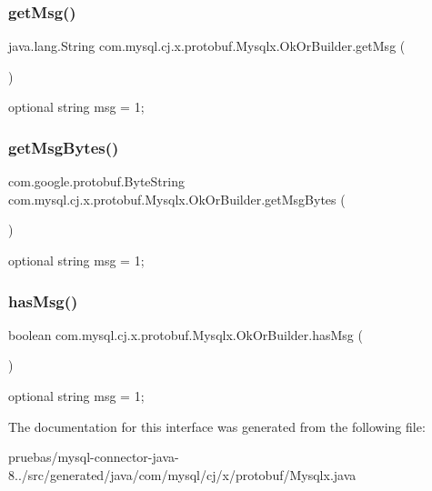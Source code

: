 \subsubsection{\texorpdfstring{get\+Msg()}{getMsg()}}
{\footnotesize\ttfamily java.\+lang.\+String com.\+mysql.\+cj.\+x.\+protobuf.\+Mysqlx.\+Ok\+Or\+Builder.\+get\+Msg (\begin{DoxyParamCaption}{ }\end{DoxyParamCaption})}

{\ttfamily optional string msg = 1;} \mbox{\label{interfacecom_1_1mysql_1_1cj_1_1x_1_1protobuf_1_1_mysqlx_1_1_ok_or_builder_af92cf058531f0821e02b879fcebb390d}} 
\subsubsection{\texorpdfstring{get\+Msg\+Bytes()}{getMsgBytes()}}
{\footnotesize\ttfamily com.\+google.\+protobuf.\+Byte\+String com.\+mysql.\+cj.\+x.\+protobuf.\+Mysqlx.\+Ok\+Or\+Builder.\+get\+Msg\+Bytes (\begin{DoxyParamCaption}{ }\end{DoxyParamCaption})}

{\ttfamily optional string msg = 1;} \mbox{\label{interfacecom_1_1mysql_1_1cj_1_1x_1_1protobuf_1_1_mysqlx_1_1_ok_or_builder_a9b1ae02c52fbfc44576de1addcfe0bf4}} 
\subsubsection{\texorpdfstring{has\+Msg()}{hasMsg()}}
{\footnotesize\ttfamily boolean com.\+mysql.\+cj.\+x.\+protobuf.\+Mysqlx.\+Ok\+Or\+Builder.\+has\+Msg (\begin{DoxyParamCaption}{ }\end{DoxyParamCaption})}

{\ttfamily optional string msg = 1;} 

The documentation for this interface was generated from the following file\+:\begin{DoxyCompactItemize}
\item 
pruebas/mysql-\/connector-\/java-\/8../src/generated/java/com/mysql/cj/x/protobuf/Mysqlx.\+java\end{DoxyCompactItemize}
